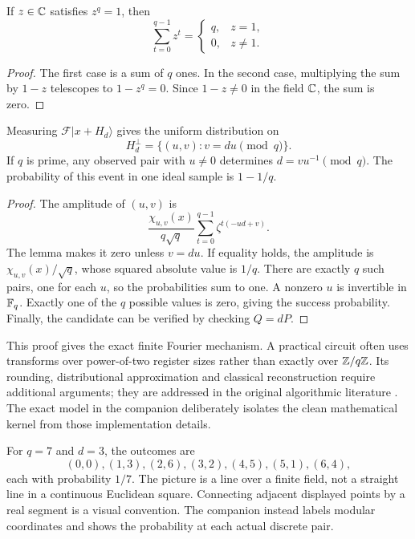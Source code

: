 \begin{lemma}
If $z\in\mathbb{C}$ satisfies $z^q=1$, then
\[
 \sum_{t=0}^{q-1}z^t=\begin{cases}q,&z=1,\\0,&z\ne1.\end{cases}
\]
\end{lemma}
\begin{proof}
The first case is a sum of $q$ ones. In the second case, multiplying the sum by $1-z$ telescopes to $1-z^q=0$. Since $1-z\ne0$ in the field $\mathbb{C}$, the sum is zero.
\end{proof}

\begin{theorem}
Measuring $\mathcal F|x+H_d\rangle$ gives the uniform distribution on
\[
 H_d^\perp=\{(u,v):v=du\pmod q\}.
\]
If $q$ is prime, any observed pair with $u\ne0$ determines $d=vu^{-1}\pmod q$. The probability of this event in one ideal sample is $1-1/q$.
\end{theorem}
\begin{proof}
The amplitude of $(u,v)$ is
\[
 \frac{\chi_{u,v}(x)}{q\sqrt q}
 \sum_{t=0}^{q-1}\zeta^{t(-ud+v)}.
\]
The lemma makes it zero unless $v=du$. If equality holds, the amplitude is
$\chi_{u,v}(x)/\sqrt q$, whose squared absolute value is $1/q$. There are exactly $q$ such pairs, one for each $u$, so the probabilities sum to one. A nonzero $u$ is invertible in $\mathbb{F}_q$. Exactly one of the $q$ possible values is zero, giving the success probability. Finally, the candidate can be verified by checking $Q=dP$.
\end{proof}

This proof gives the exact finite Fourier mechanism. A practical circuit often uses transforms over power-of-two register sizes rather than exactly over $\mathbb{Z}/q\mathbb{Z}$. Its rounding, distributional approximation and classical reconstruction require additional arguments; they are addressed in the original algorithmic literature \cite{Shor,ProosZalka}. The exact model in the companion deliberately isolates the clean mathematical kernel from those implementation details.

\begin{example}
For $q=7$ and $d=3$, the outcomes are
\[
 (0,0),(1,3),(2,6),(3,2),(4,5),(5,1),(6,4),
\]
each with probability $1/7$. The picture is a line over a finite field, not a straight line in a continuous Euclidean square. Connecting adjacent displayed points by a real segment is a visual convention. The companion instead labels modular coordinates and shows the probability at each actual discrete pair.
\end{example}

